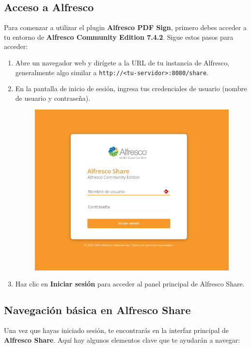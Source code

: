 \documentclass{template/ol-softwaremanual}
\begin{document}
\subsection{Acceso a Alfresco}
Para comenzar a utilizar el plugin \textbf{Alfresco PDF Sign}, primero debes acceder a tu entorno de \textbf{Alfresco Community Edition 7.4.2}. Sigue estos pasos para acceder:

\begin{enumerate}
	\item Abre un navegador web y dirígete a la URL de tu instancia de Alfresco, generalmente algo similar a \texttt{http://<tu-servidor>:8080/share}.
	\item En la pantalla de inicio de sesión, ingresa tus credenciales de usuario (nombre de usuario y contraseña).
	\begin{figure}[h]
		\centering
		\includegraphics[width=\textwidth]{images/login}
		\label{fig:etiqueta_imagen}
	\end{figure}
	\item Haz clic en \textbf{Iniciar sesión} para acceder al panel principal de Alfresco Share.
\end{enumerate}

\subsection{Navegación básica en Alfresco Share}
Una vez que hayas iniciado sesión, te encontrarás en la interfaz principal de \textbf{Alfresco Share}. Aquí hay algunos elementos clave que te ayudarán a navegar:
\end{document}
